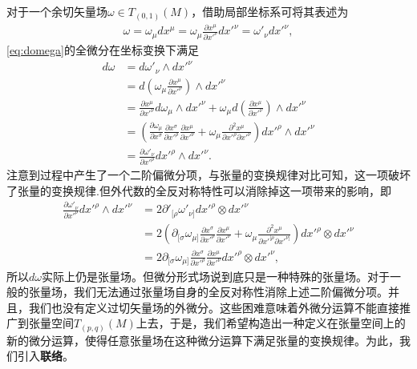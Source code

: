 		对于一个余切矢量场$\omega\in T_{(0,1)}(M)$，借助局部坐标系可将其表述为
		\begin{equation}\label{eq:domega}
			\begin{split}
				\omega=\omega_\mu dx^\mu=\omega_\mu\frac{\partial{x}^\mu}{\partial {x'}^\nu}d{x'}^\nu=\omega'_\nu d{x'}^\nu,
			\end{split}
		\end{equation}
		\ref{eq:domega}的全微分在坐标变换下满足
		\begin{equation}
			\begin{split}	
			d\omega &=d\omega'_\nu{\wedge}d{x'}^\nu\\
			&= d\left(\omega_\mu\frac{\partial{x}^\mu}{{\partial}{x'}^\nu}\right)\wedge d{x'}^\nu\\
			&=\frac{\partial{x}^\mu}{{\partial}{x'}^\nu}d\omega_\mu{\wedge}d{x'}^\nu+\omega_{\mu}d\left(\frac{\partial{x}^\mu}{\partial {x'}^\nu}\right){\wedge}d{x'}^\nu\\
			&=\left(\frac{\partial{\omega}_\mu}{{\partial}{x}^\sigma}\frac{\partial{x}^\sigma}{\partial {x'}^\rho}\frac{\partial{x}^\mu}{{\partial}{x'}^\nu}+{\omega}_\mu\frac{\partial^2{x}^\mu}{\partial {x'}^\rho{\partial}{x'}^\nu}\right)d{x'}^\rho{\wedge}d{x'}^\nu\\
			&=\frac{\partial\omega'_\nu}{{\partial}{x'}^\rho}d{x'}^\rho{\wedge}d{x'}^\nu.
			\end{split}
		\end{equation}
		注意到过程中产生了一个二阶偏微分项，与张量的变换规律对比可知，这一项破坏了张量的变换规律.但外代数的全反对称特性可以消除掉这一项带来的影响，即
		\begin{equation}
			\begin{split}
				\frac{\partial\omega'_\nu}{{\partial}{x'}^\rho}d{x'}^\rho{\wedge}d{x'}^\nu&=2\partial'_{[\rho}\omega'_{\nu]}{dx'}^{\rho}\otimes{dx'}^\nu\\
				&=2\left(\partial_{[\sigma}\omega_{\mu]}\frac{\partial{x}^\sigma}{\partial {x'}^\rho}\frac{\partial{x}^\mu}{{\partial}{x'}^\nu}+{\omega}_\mu\frac{\partial^2{x}^\mu}{\partial {x'}^{[\rho}{\partial}{x'}^{\nu]}}\right){dx'}^{\rho}\otimes{dx'}^\nu\\
			&=2\partial_{[\sigma}\omega_{\mu]}\frac{\partial{x}^\sigma}{\partial {x'}^\rho}\frac{\partial{x}^\mu}{{\partial}{x'}^\nu}{dx'}^{\rho}\otimes{dx'}^\nu,
			\end{split}
		\end{equation}
		所以$d\omega$实际上仍是张量场。但微分形式场说到底只是一种特殊的张量场。对于一般的张量场，我们无法通过张量场自身的全反对称性消除上述二阶偏微分项。并且，我们也没有定义过切矢量场的外微分。这些困难意味着外微分运算不能直接推广到张量空间$T_{(p,q)}(M)$上去，于是，我们希望构造出一种定义在张量空间上的新的微分运算，使得任意张量场在这种微分运算下满足张量的变换规律。为此，我们引入\textbf{联络}。
	
